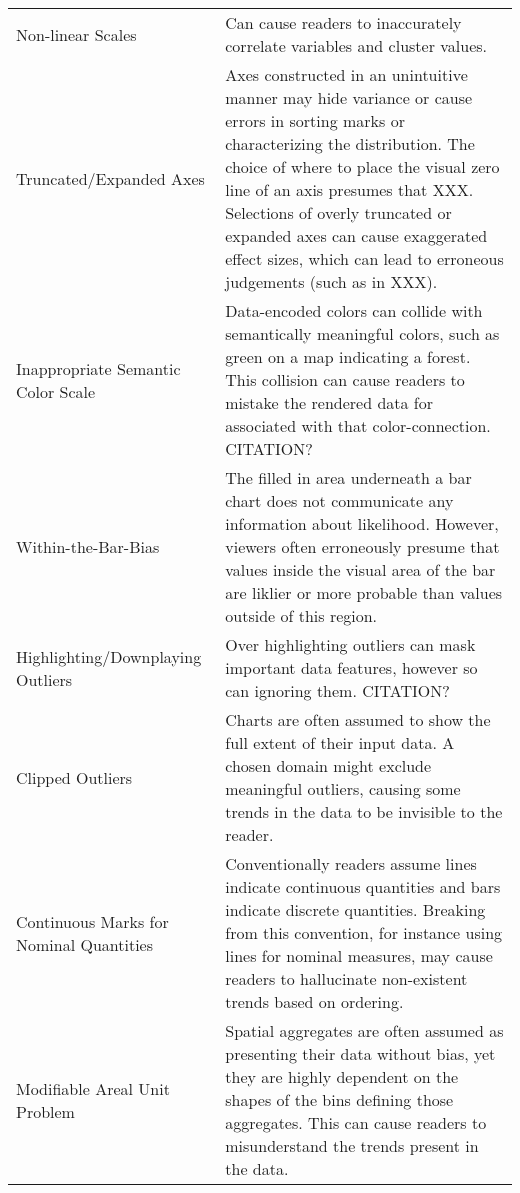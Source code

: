 \begin{longtable}{p{3cm}p{14cm}}
 \rowcolor{colorc-opaque}Non-linear Scales & Can cause readers to inaccurately correlate variables and cluster values. \cite{pandey2015deceptive}\\
 \rowcolor{colorc}Truncated/Expanded Axes & Axes constructed in an unintuitive manner may hide variance or cause errors in sorting marks or characterizing the distribution.  The choice of where to place the visual zero line of an axis presumes that XXX. Selections of overly truncated or expanded axes can cause exaggerated effect sizes, which can lead to erroneous judgements (such as in XXX).  \cite{pandey2015deceptive, correll2017black, cleveland1982variables, ritchie2019lie, correll2019truncating}\\
 \rowcolor{colorc-opaque}Inappropriate Semantic Color Scale  & Data-encoded colors can collide with semantically meaningful colors, such as green on a map indicating a forest. This collision can cause readers to mistake the rendered data for associated with that color-connection. CITATION?\\
 \rowcolor{colorc}Within-the-Bar-Bias & The filled in area underneath a bar chart does not communicate any information about likelihood. However, viewers often erroneously presume that values inside the visual area of the bar are liklier or more probable than values outside of this region. \cite{newman2012bar}\\
 \rowcolor{colorc-opaque}Highlighting/Downplaying Outliers & Over highlighting outliers can mask important data features, however so can ignoring them. CITATION?\\
 \rowcolor{colorc}Clipped Outliers  & Charts are often assumed to show the full extent of their input data. A chosen domain might exclude meaningful outliers, causing some trends in the data to be invisible to the reader. \\
 \rowcolor{colorc-opaque}Continuous Marks for Nominal Quantities  & Conventionally readers assume lines indicate continuous quantities and bars indicate discrete quantities. Breaking from this convention, for instance using lines for nominal measures, may cause readers to hallucinate non-existent trends based on ordering.  \cite{mcnuttlinting, zacks1999bars}\\
 \rowcolor{colorc}Modifiable Areal Unit Problem  & Spatial aggregates are often assumed as presenting their data without bias, yet they are highly dependent on the shapes of the bins defining those aggregates. This can cause readers to misunderstand the trends present in the data. \cite{fotheringham1991modifiable, kindlmann2014algebraic}\\

\end{longtable}
